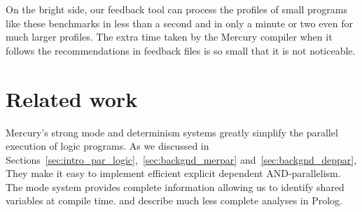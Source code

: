 On the bright side,
our feedback tool can process the profiles of small programs like these
benchmarks in less than a second 
and in only a minute or two even for much larger profiles.
The extra time taken by the Mercury compiler
when it follows the recommendations in feedback files
is so small that it is not noticeable.


\section{Related work}
\label{sec:overlap_related}



Mercury's strong mode and determinism systems
greatly simplify the parallel execution of logic programs.
As we discussed in
Sections~\ref{sec:intro_par_logic},~\ref{sec:backgnd_merpar} and~\ref{sec:backgnd_deppar},
They make it easy to implement efficient explicit dependent AND-parallelism.
The mode system provides complete information allowing us to identify
shared variables at compile time.
\citet*{DBLP:journals/tcs/GrasH09} and \citet{Hermenegildo1995} describe
much less complete analyses in Prolog.


